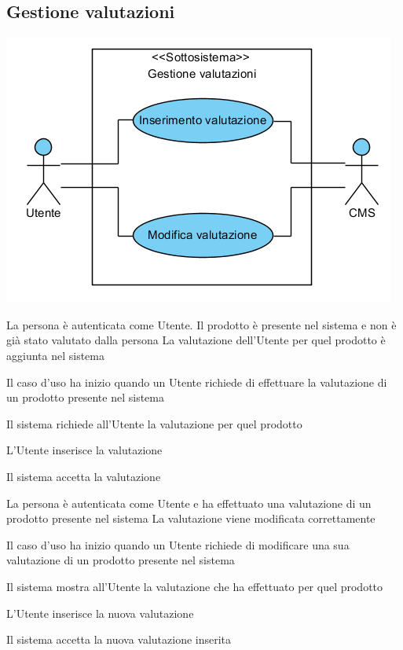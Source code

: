 \subsection{Gestione valutazioni}
\begin{center}
   \includegraphics[width=\textwidth]{assets/visualParadigm/GestioneValutazioni}
\end{center}
{}
{La persona è autenticata come Utente. Il prodotto è presente nel sistema e non è già stato valutato dalla persona}
{La valutazione dell'Utente per quel prodotto è aggiunta nel sistema}
{\begin{enumCU}
	\item Il caso d'uso ha inizio quando un Utente richiede di effettuare la valutazione di un prodotto presente nel sistema
	\item Il sistema richiede all'Utente la valutazione per quel prodotto
	\item L'Utente inserisce la valutazione
	\item Il sistema accetta la valutazione
\end{enumCU}}

\tabcuvspace

{}
{La persona è autenticata come Utente e ha effettuato una valutazione di un prodotto presente nel sistema}
{La valutazione viene modificata correttamente}
{\begin{enumCU}
	\item Il caso d'uso ha inizio quando un Utente richiede di modificare una sua valutazione di un prodotto presente nel sistema
	\item Il sistema mostra all'Utente la valutazione che ha effettuato per quel prodotto
	\item L'Utente inserisce la nuova valutazione
	\item Il sistema accetta la nuova valutazione inserita
\end{enumCU}}

